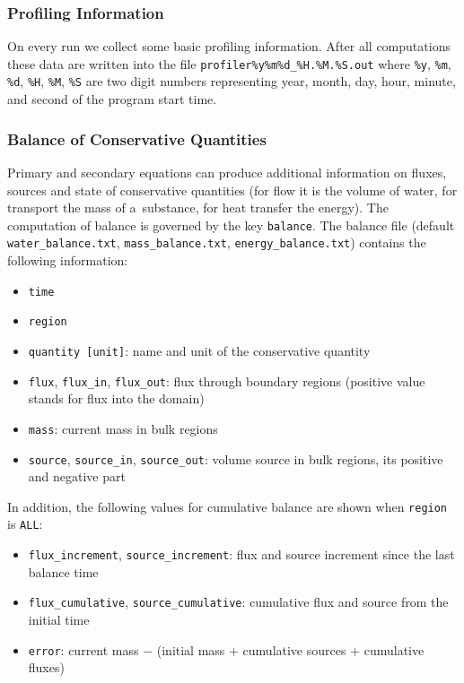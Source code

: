 \subsubsection{Profiling Information}
On every run we collect some basic profiling information. After all computations these data are written into the file
\verb'profiler%y%m%d_%H.%M.%S.out' where \verb'%y', \verb'%m', \verb'%d', \verb'%H', \verb'%M', \verb'%S' are 
two digit numbers representing year, month, day, hour, minute, and second of the program start time.

\subsubsection{Balance of Conservative Quantities}\label{sec:balance_output}
Primary and secondary equations can produce additional information on fluxes, sources and state of conservative quantities (for flow it is the volume of water, for transport the mass of a~substance, for heat transfer the energy).
The computation of balance is governed by the key \verb'balance'.
The balance file (default \verb'water_balance.txt', \verb'mass_balance.txt', \verb'energy_balance.txt') contains the following information:
\begin{itemize}
\item \texttt{time}
\item \texttt{region}
\item \texttt{quantity [unit]}: name and unit of the conservative quantity
\item \texttt{flux}, \texttt{flux\_in}, \texttt{flux\_out}: flux through boundary regions (positive value stands for flux into the domain)
\item \texttt{mass}: current mass in bulk regions
\item \texttt{source}, \texttt{source\_in}, \texttt{source\_out}: volume source in bulk regions, its positive and negative part 
\end{itemize}
In addition, the following values for cumulative balance are shown when \texttt{region} is \texttt{ALL}:
\begin{itemize}
\item \texttt{flux\_increment}, \texttt{source\_increment}: flux and source increment since the last balance time
\item \texttt{flux\_cumulative}, \texttt{source\_cumulative}: cumulative flux and source from the initial time
\item \texttt{error}: current mass $-$ (initial mass + cumulative sources + cumulative fluxes)
\end{itemize}


